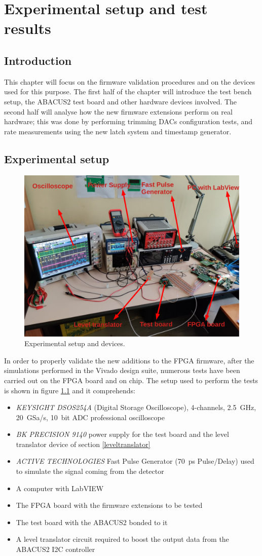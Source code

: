 \chapter{Experimental setup and test results}
\section{Introduction}
This chapter will focus on the firmware validation procedures and on the devices used for this purpose.
The first half of the chapter will introduce the test bench setup, the ABACUS2 test board and other hardware devices involved.
The second half will analyse how the new firmware extensions perform on real hardware; this was done by performing trimming DACs configuration tests, and rate measurements using the new latch system and timestamp generator.

\section{Experimental setup}\label{testbench}
\begin{figure}[H]
	\centering
	\includegraphics[width=0.7\linewidth]{IMG/ch5/TESTBENCH}
	\caption{Experimental setup and devices.}
	\label{fig:testbench}
\end{figure}
In order to properly validate the new additions to the FPGA firmware, after the simulations performed in the Vivado design suite, numerous tests have been carried out on the FPGA board and on chip.
The setup used to perform the tests is shown in figure \ref{fig:testbench} and it comprehends:
\begin{itemize}
	\item \textit{KEYSIGHT DSOS254A} (Digital Storage Oscilloscope), 4-channels, 2.5~GHz, 20~GSa/s, 10~bit ADC professional oscilloscope
	\item \textit{BK PRECISION 9140} power supply for the test board and the level translator device of section \ref{leveltranslator}
	\item \textit{ACTIVE TECHNOLOGIES} Fast Pulse Generator (70~ps Pulse/Delay) used to simulate the signal coming from the detector
	\item A computer with LabVIEW 
	\item The FPGA board with the firmware extensions to be tested
	\item The test board with the ABACUS2 bonded to it
	\item A level translator circuit required to boost the output data from the ABACUS2 I2C controller
\end{itemize}

